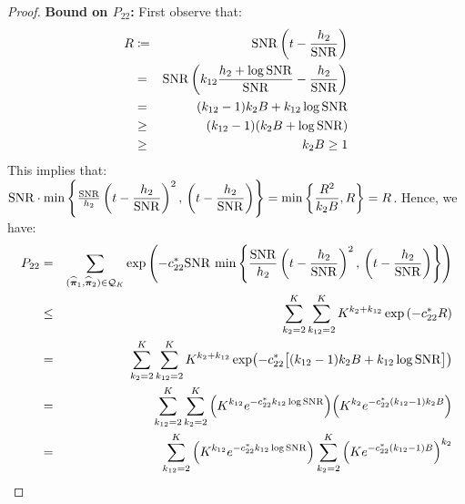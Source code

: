 \documentclass[numsec,webpdf,modern,medium,namedate]{oup-authoring-template}
\theoremstyle{thmstyleone}%
\theoremstyle{thmstyletwo}%
\theoremstyle{thmstylethree}%
\begin{document}
\begin{proof}
\textbf{Bound on $P_{22}$:}
First observe that:
\begin{eqnarray*}
    R & \coloneq & \mathrm{SNR}\left(t - \dfrac{h_2}{\mathrm{SNR}}\right) \\
    & = & \mathrm{SNR}\left(k_{12}\dfrac{h_2 + \log \mathrm{SNR}}{\mathrm{SNR}} - \dfrac{h_2}{\mathrm{SNR}}\right)\\
    & = & (k_{12} - 1)k_2B + k_{12}\log \mathrm{SNR}\\
    & \geq & (k_{12} - 1)(k_2B + \log \mathrm{SNR})\\
    & \geq & k_2B \geq 1\\
\end{eqnarray*}
This implies that: $\mathrm{SNR} \cdot \min \left\{\frac{\mathrm{SNR}}{h_2}\left(t - \dfrac{h_2}{\mathrm{SNR}}\right)^2, \, \left(t - \dfrac{h_2}{\mathrm{SNR}}\right) \right\} =  \min \left\{\dfrac{R^2}{k_2B}, R\right\} = R$. Hence, we have:
\begin{eqnarray*}
    P_{22} & = & \sum_{(\widehat{\boldsymbol{\pi}}_1, \widehat{\boldsymbol{\pi}}_2 ) \in \mathcal{Q}_K}\exp \left( - c^\ast_{22} \mathrm{SNR} \, \min \left\{\dfrac{\mathrm{SNR}}{h_2}\left(t - \dfrac{h_2}{\mathrm{SNR}}\right)^2, \, \left(t - \dfrac{h_2}{\mathrm{SNR}}\right) \right\}\right)\\
    & \leq & \sum_{k_2 = 2}^K\sum_{k_{12}=2}^K K^{k_2 + k_{12}}\exp\left(-c^\ast_{22}R\right) \notag\\
    & = &\sum_{k_2 = 2}^K \sum_{k_{12}=2}^K K^{k_2 + k_{12}}
    \exp\!\left(-c^\ast_{22}\big[(k_{12}-1)k_2 B + k_{12}\log \mathrm{SNR}\big]\right)\\
    & = & \sum_{k_{12}=2}^K \sum_{k_2 = 2}^K
    \Big(K^{k_{12}} e^{-c^\ast_{22} k_{12}\log\mathrm{SNR}}\Big)
    \Big(K^{k_2} e^{-c^\ast_{22} (k_{12}-1)k_2 B}\Big)\\
    & = & \sum_{k_{12}=2}^K
    \Big(K^{k_{12}} e^{-c^\ast_{22} k_{12}\log\mathrm{SNR}}\Big)
    \sum_{k_2=2}^K \Big(Ke^{-c^\ast_{22} (k_{12}-1)B}\Big)^{k_2}
\end{eqnarray*}


\end{proof}
\end{document}
